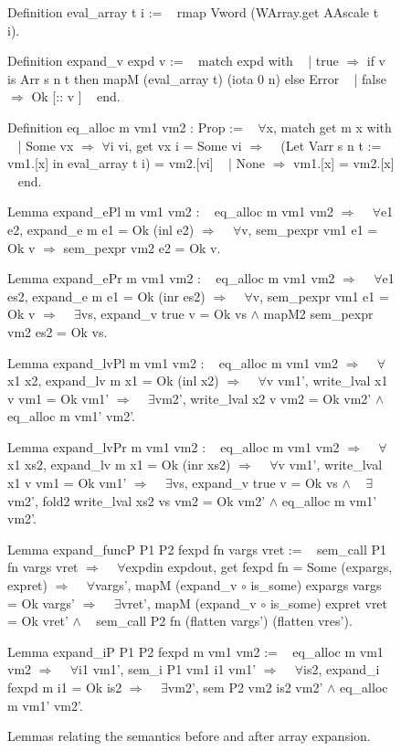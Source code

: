 \documentclass{article}
\begin{document}
\begin{figure}[p]
\obeylines\obeyspaces\ttfamily%
Definition eval\_array t i :=
~ rmap Vword (WArray.get AAscale t i).

Definition expand\_v expd v :=
~ match expd with
~ | true  \(\Rightarrow\) if v is Arr s n t then mapM (eval\_array t) (iota 0 n) else Error
~ | false \(\Rightarrow\) Ok [:: v ]
~ end.

Definition eq\_alloc m vm1 vm2 : Prop :=
~ \(\forall\)x, match get m x with
~ | Some vx \(\Rightarrow\) \(\forall\)i vi, get vx i = Some vi \(\Longrightarrow\)
~   (Let Varr s n t := vm1.[x] in eval\_array t i) = vm2.[vi]
~ | None \(\Rightarrow\) vm1.[x] = vm2.[x]
~ end.

Lemma expand\_ePl m vm1 vm2 :
~ eq\_alloc m vm1 vm2 \(\Longrightarrow\)
~ \(\forall\)e1 e2, expand\_e m e1 = Ok (inl e2) \(\Longrightarrow\)
~ \(\forall\)v, sem\_pexpr vm1 e1 = Ok v \(\Longrightarrow\) sem\_pexpr vm2 e2 = Ok v.

Lemma expand\_ePr m vm1 vm2 :
~ eq\_alloc m vm1 vm2 \(\Longrightarrow\)
~ \(\forall\)e1 es2, expand\_e m e1 = Ok (inr es2) \(\Longrightarrow\)
~ \(\forall\)v, sem\_pexpr vm1 e1 = Ok v \(\Longrightarrow\)
~ \(\exists\)vs, expand\_v true v = Ok vs \(\wedge\) mapM2 sem\_pexpr vm2 es2 = Ok vs.

Lemma expand\_lvPl m vm1 vm2 :
~ eq\_alloc m vm1 vm2 \(\Longrightarrow\)
~ \(\forall\)x1 x2, expand\_lv m x1 = Ok (inl x2) \(\Longrightarrow\)
~ \(\forall\)v vm1', write\_lval x1 v vm1 = Ok vm1' \(\Longrightarrow\)
~ \(\exists\)vm2', write\_lval x2 v vm2 = Ok vm2' \(\wedge\) eq\_alloc m vm1' vm2'.

Lemma expand\_lvPr m vm1 vm2 :
~ eq\_alloc m vm1 vm2 \(\Longrightarrow\)
~ \(\forall\)x1 xs2, expand\_lv m x1 = Ok (inr xs2) \(\Longrightarrow\)
~ \(\forall\)v vm1', write\_lval x1 v vm1 = Ok vm1' \(\Longrightarrow\)
~ \(\exists\)vs, expand\_v true v = Ok vs \(\wedge\)
~   \(\exists\)vm2', fold2 write\_lval xs2 vs vm2 = Ok vm2' \(\wedge\) eq\_alloc m vm1' vm2'.

Lemma expand\_funcP P1 P2 fexpd fn vargs vret :=
~ sem\_call P1 fn vargs vret \(\Longrightarrow\)
~ \(\forall\)expdin expdout, get fexpd fn = Some (expargs, expret) \(\Longrightarrow\)
~ \(\forall\)vargs', mapM (expand\_v \(\circ\) is\_some) expargs vargs = Ok vargs' \(\Longrightarrow\)
~ \(\exists\)vret',  mapM (expand\_v \(\circ\) is\_some) expret  vret  = Ok vret'  \(\wedge\)
~   sem\_call P2 fn (flatten vargs') (flatten vres').

Lemma expand\_iP P1 P2 fexpd m vm1 vm2 :=
~ eq\_alloc m vm1 vm2 \(\Longrightarrow\)
~ \(\forall\)i1 vm1', sem\_i P1 vm1 i1 vm1' \(\Longrightarrow\)
~ \(\forall\)is2, expand\_i fexpd m i1 = Ok is2 \(\Longrightarrow\)
~ \(\exists\)vm2', sem P2 vm2 is2 vm2' \(\wedge\) eq\_alloc m vm1' vm2'.
\normalfont%
\caption{Lemmas relating the semantics before and after array expansion.}
\end{figure}
\end{document}
